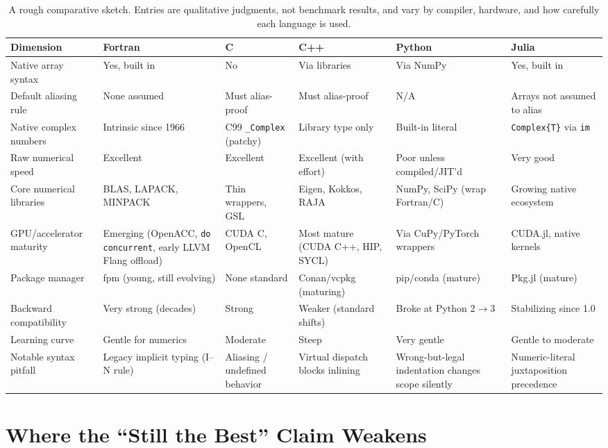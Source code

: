 \begin{table}[h]
\centering
\small
\renewcommand{\arraystretch}{1.3}
\begin{tabular}{p{2.6cm}p{2.2cm}p{2.1cm}p{2.1cm}p{2.1cm}p{2.1cm}}
\toprule
\textbf{Dimension} & \textbf{Fortran} & \textbf{C} & \textbf{C++} & \textbf{Python} & \textbf{Julia} \\
\midrule
Native array syntax & Yes, built in & No & Via libraries & Via NumPy & Yes, built in \\
Default aliasing rule & None assumed & Must alias-proof & Must alias-proof & N/A & Arrays not assumed to alias \\
Native complex numbers & Intrinsic since 1966 & C99 \texttt{\_Complex} (patchy) & Library type only & Built-in literal & \texttt{Complex\{T\}} via \texttt{im} \\
Raw numerical speed & Excellent & Excellent & Excellent (with effort) & Poor unless compiled/JIT'd & Very good \\
Core numerical libraries & BLAS, LAPACK, MINPACK & Thin wrappers, GSL & Eigen, Kokkos, RAJA & NumPy, SciPy (wrap Fortran/C) & Growing native ecosystem \\
GPU/accelerator maturity & Emerging (OpenACC, \texttt{do concurrent}, early LLVM Flang offload) & CUDA C, OpenCL & Most mature (CUDA C++, HIP, SYCL) & Via CuPy/PyTorch wrappers & CUDA.jl, native kernels \\
Package manager & fpm (young, still evolving) & None standard & Conan/vcpkg (maturing) & pip/conda (mature) & Pkg.jl (mature) \\
Backward compatibility & Very strong (decades) & Strong & Weaker (standard shifts) & Broke at Python 2$\to$3 & Stabilizing since 1.0 \\
Learning curve & Gentle for numerics & Moderate & Steep & Very gentle & Gentle to moderate \\
Notable syntax pitfall & Legacy implicit typing (I--N rule) & Aliasing / undefined behavior & Virtual dispatch blocks inlining & Wrong-but-legal indentation changes scope silently & Numeric-literal juxtaposition precedence \\
\bottomrule
\end{tabular}
\caption{A rough comparative sketch. Entries are qualitative judgments, not benchmark results, and vary by compiler, hardware, and how carefully each language is used.}
\end{table}

\section{Where the ``Still the Best'' Claim Weakens}

